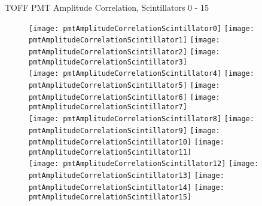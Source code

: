 \documentclass[11pt]{beamer}
\begin{document}
\begin{frame}{TOFF PMT Amplitude Correlation, Scintillators 0 - 15}
\begin{figure}
\centering
\texttt{[image: pmtAmplitudeCorrelationScintillator0]}
\texttt{[image: pmtAmplitudeCorrelationScintillator1]}
\texttt{[image: pmtAmplitudeCorrelationScintillator2]}
\texttt{[image: pmtAmplitudeCorrelationScintillator3]} \\
\texttt{[image: pmtAmplitudeCorrelationScintillator4]}
\texttt{[image: pmtAmplitudeCorrelationScintillator5]}
\texttt{[image: pmtAmplitudeCorrelationScintillator6]}
\texttt{[image: pmtAmplitudeCorrelationScintillator7]} \\
\texttt{[image: pmtAmplitudeCorrelationScintillator8]}
\texttt{[image: pmtAmplitudeCorrelationScintillator9]}
\texttt{[image: pmtAmplitudeCorrelationScintillator10]}
\texttt{[image: pmtAmplitudeCorrelationScintillator11]} \\
\texttt{[image: pmtAmplitudeCorrelationScintillator12]}
\texttt{[image: pmtAmplitudeCorrelationScintillator13]}
\texttt{[image: pmtAmplitudeCorrelationScintillator14]}
\texttt{[image: pmtAmplitudeCorrelationScintillator15]} \\
\end{figure}
\end{frame}
\end{document}
